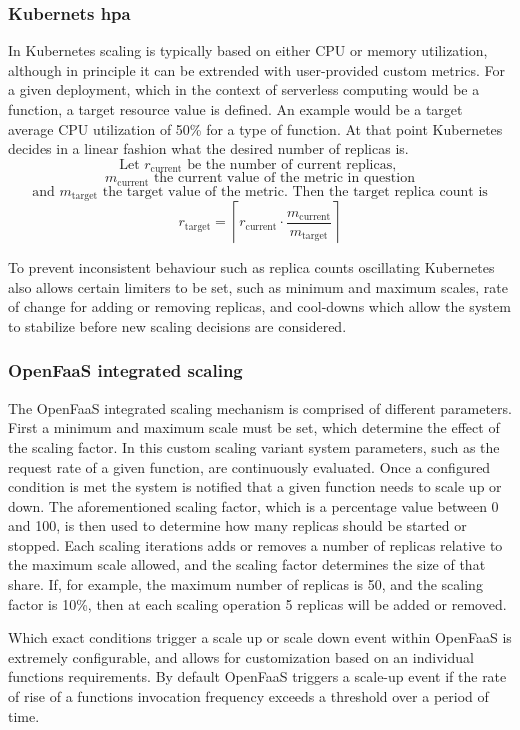 \subsubsection{Kubernets \gls{hpa}}
In Kubernetes scaling is typically based on either CPU or memory utilization, although in principle it can be extrended with user-provided custom metrics\cite{kubernetes-hpa}.
For a given deployment, which in the context of serverless computing would be a function, a target resource value is defined.
An example would be a target average CPU utilization of 50\% for a type of function.
At that point Kubernetes decides in a linear fashion what the desired number of replicas is.
\[ \text{Let } r_{\text{current}} \text{ be the number of current replicas, }\]
\[m_{\text{current}} \text{ the current value of the metric in question}\]
\[\text{ and } m_{\text{target}} \text{ the target value of the metric. Then the target replica count is }\]
\[ r_{\text{target}} = \left \lceil r_{\text{current}} \cdot \frac{m_{\text{current}}}{m_{\text{target}}} \right \rceil\]

To prevent inconsistent behaviour such as replica counts oscillating Kubernetes also allows certain limiters to be set, such as minimum and maximum scales, rate of change for adding or removing replicas, and cool-downs which allow the system to stabilize before new scaling decisions are considered\cite{kubernetes-hpa}.

\subsubsection{OpenFaaS integrated scaling}
The OpenFaaS integrated scaling mechanism is comprised of different parameters.
First a minimum and maximum scale must be set, which determine the effect of the scaling factor.
In this custom scaling variant system parameters, such as the request rate of a given function, are continuously evaluated.
Once a configured condition is met the system is notified that a given function needs to scale up or down.
The aforementioned scaling factor, which is a percentage value between 0 and 100, is then used to determine how many replicas should be started or stopped\cite{openfaas-autoscaling}.
Each scaling iterations adds or removes a number of replicas relative to the maximum scale allowed, and the scaling factor determines the size of that share.
If, for example, the maximum number of replicas is 50, and the scaling factor is 10\%, then at each scaling operation 5 replicas will be added or removed.

Which exact conditions trigger a scale up or scale down event within OpenFaaS is extremely configurable, and allows for customization based on an individual functions requirements.
By default OpenFaaS triggers a scale-up event if the rate of rise of a functions invocation frequency exceeds a threshold over a period of time.



